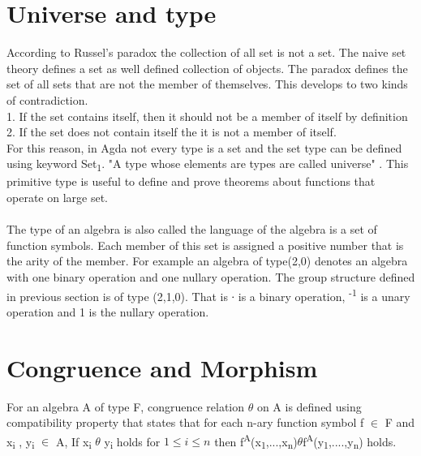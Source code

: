 \section{Universe and type}
According to Russel's paradox \cite{russell2020principles} the collection of all set is not a set. The naive set theory defines a set as well defined collection of objects. The paradox defines the set of all sets that are not the member of themselves. This develops to two kinds of contradiction. \cite{russelPara}\\
1. If the set contains itself, then it should not be a member of itself by definition\\
2. If the set does not contain itself the it is not a member of itself.\\
For this reason, in Agda not every type is a set and the set type can be defined using keyword Set\textsubscript{1}. "A type whose elements are types are called universe" \cite{universeagda}. This primitive type is useful to define and prove theorems about functions that operate on large set.\\
\\
The type of an algebra is also called the language of the algebra is a set of function symbols. Each member of this set is assigned a positive number that is the arity of the member. For example an algebra of type(2,0) denotes an algebra with one binary operation and one nullary operation. The group structure defined in previous section is of type (2,1,0). That is ∙ is a binary operation, \textsuperscript{-1} is a unary operation and 1 is the nullary operation. 

\section{Congruence and Morphism}
For an algebra A of type F, congruence relation \(\theta\) on A is defined using compatibility property that states that for each n-ary function symbol f \(\in\) F and x\textsubscript{i} , y\textsubscript{i} \(\in\) A, If x\textsubscript{i} \(\theta\) y\textsubscript{i}  holds for \(1\leq i \leq n\) then f\textsuperscript{A}(x\textsubscript{1},...,x\textsubscript{n})\(\theta\)f\textsuperscript{A}(y\textsubscript{1},....,y\textsubscript{n}) holds. \cite{sankappanavar1981course}
\\
